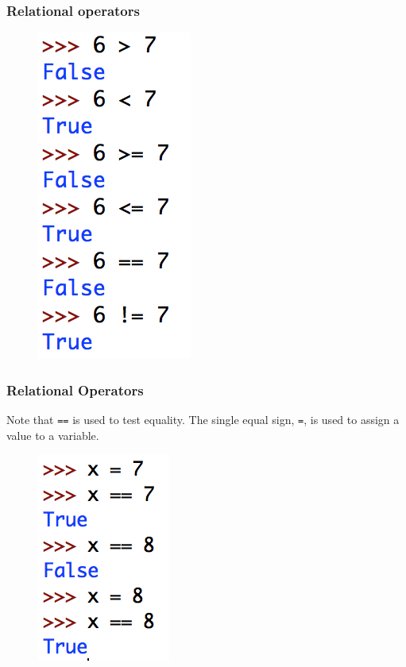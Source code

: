 \documentclass{beamer}
\begin{document}
\begin{frame}
\frametitle{Relational operators}

\begin{figure}\centering
\includegraphics[scale=.8]{IMG/2.png}
\end{figure}
\end{frame}

\begin{frame}[fragile]
\frametitle{Relational Operators}

Note that \verb|==| is used to test equality. The single equal sign, \verb|=|, is used to assign a value to a variable.
\begin{figure}\centering
\includegraphics[scale=.8]{IMG/assign.png}
\end{figure}
\end{frame}
\end{document}
